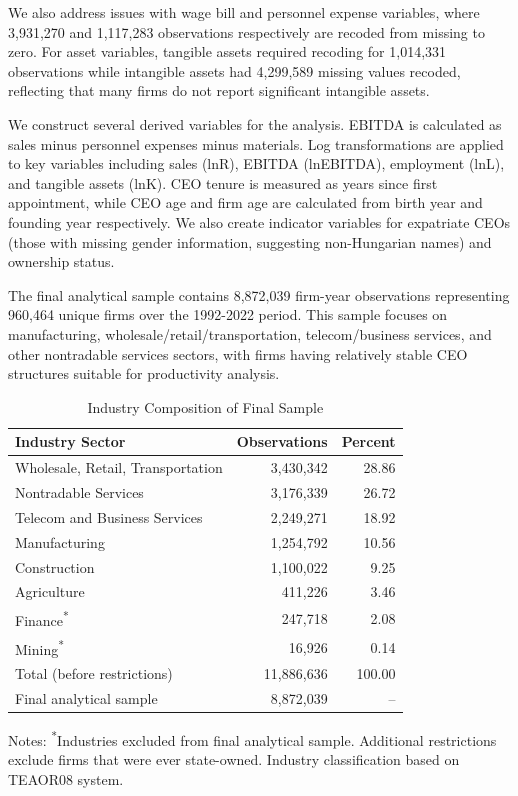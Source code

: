 \documentclass[11pt,a4paper]{article}
\begin{document}
We also address issues with wage bill and personnel expense variables, where 3,931,270 and 1,117,283 observations respectively are recoded from missing to zero. For asset variables, tangible assets required recoding for 1,014,331 observations while intangible assets had 4,299,589 missing values recoded, reflecting that many firms do not report significant intangible assets.

We construct several derived variables for the analysis. EBITDA is calculated as sales minus personnel expenses minus materials. Log transformations are applied to key variables including sales (lnR), EBITDA (lnEBITDA), employment (lnL), and tangible assets (lnK). CEO tenure is measured as years since first appointment, while CEO age and firm age are calculated from birth year and founding year respectively. We also create indicator variables for expatriate CEOs (those with missing gender information, suggesting non-Hungarian names) and ownership status.

The final analytical sample contains 8,872,039 firm-year observations representing 960,464 unique firms over the 1992-2022 period. This sample focuses on manufacturing, wholesale/retail/transportation, telecom/business services, and other nontradable services sectors, with firms having relatively stable CEO structures suitable for productivity analysis.

\begin{table}[htbp]
\centering
\caption{Industry Composition of Final Sample}
\label{tab:industry}
\begin{tabular}{lrr}
\toprule
Industry Sector & Observations & Percent \\
\midrule
Wholesale, Retail, Transportation & 3,430,342 & 28.86 \\
Nontradable Services & 3,176,339 & 26.72 \\
Telecom and Business Services & 2,249,271 & 18.92 \\
Manufacturing & 1,254,792 & 10.56 \\
Construction & 1,100,022 & 9.25 \\
Agriculture & 411,226 & 3.46 \\
Finance\textsuperscript{*} & 247,718 & 2.08 \\
Mining\textsuperscript{*} & 16,926 & 0.14 \\
\midrule
Total (before restrictions) & 11,886,636 & 100.00 \\
Final analytical sample & 8,872,039 & -- \\
\bottomrule
\end{tabular}
\footnotesize
Notes: \textsuperscript{*}Industries excluded from final analytical sample. Additional restrictions exclude firms that were ever state-owned. Industry classification based on TEAOR08 system.
\end{table}
\end{document}
